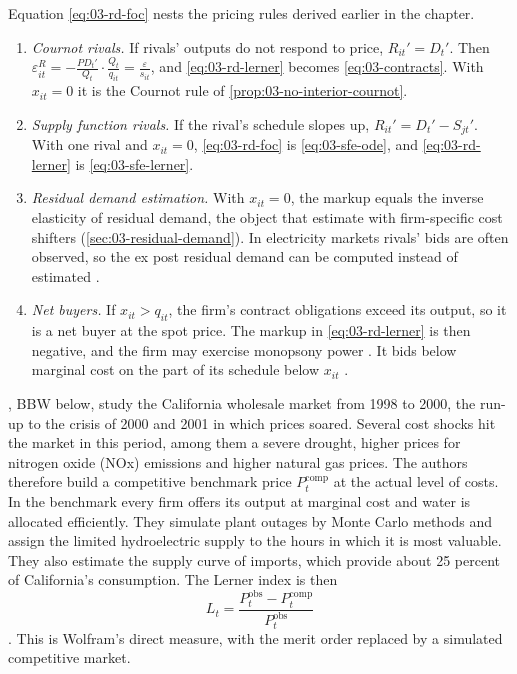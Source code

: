 \begin{remark}\label{rem:03-rd-nesting}
Equation \eqref{eq:03-rd-foc} nests the pricing rules derived earlier in the chapter.
\begin{enumerate}[label=(\roman*)]
\item \emph{Cournot rivals.} If rivals' outputs do not respond to price, $R_{it}' = D_t'$. Then
  $\varepsilon^R_{it} = -\frac{P D_t'}{Q_t}\cdot\frac{Q_t}{q_{it}} = \frac{\varepsilon}{s_{it}}$, and
  \eqref{eq:03-rd-lerner} becomes \eqref{eq:03-contracts}. With $x_{it} = 0$ it is the Cournot rule of
  \cref{prop:03-no-interior-cournot}.
\item \emph{Supply function rivals.} If the rival's schedule slopes up, $R_{it}' = D_t' - S_{jt}'$. With one rival
  and $x_{it} = 0$, \eqref{eq:03-rd-foc} is \eqref{eq:03-sfe-ode}, and \eqref{eq:03-rd-lerner} is
  \eqref{eq:03-sfe-lerner}.
\item \emph{Residual demand estimation.} With $x_{it} = 0$, the markup equals the inverse elasticity of residual
  demand, the object
  that \citet{BakerBresnahan1988} estimate with firm-specific cost shifters (\cref{sec:03-residual-demand}). In
  electricity markets rivals' bids are often observed, so the ex post residual demand can be computed instead of
  estimated \citep[p.~695]{KelloggReguant2021}.
\item \emph{Net buyers.} If $x_{it} > q_{it}$, the firm's contract obligations exceed its output, so it is a net
  buyer at the spot price. The markup in \eqref{eq:03-rd-lerner} is then negative, and the firm may exercise
  monopsony power \citep[p.~694]{KelloggReguant2021}. It bids below marginal cost on the part of its schedule below
  $x_{it}$ \citep[p.~145]{HortacsuPerrigne2021}.
\end{enumerate}
\end{remark}

\citet{BorensteinBushnellWolak2002}, BBW below, study the California wholesale market from 1998 to 2000, the run-up to the
crisis of 2000 and 2001 in which prices soared. Several cost shocks hit the market in this period, among them a severe
drought, higher prices for nitrogen oxide (NOx) emissions and higher natural gas prices. The authors therefore build a
competitive benchmark price $P^{\mathrm{comp}}_t$ at the actual level of costs. In the benchmark every firm offers its
output at marginal cost and water is allocated efficiently. They simulate plant outages by Monte Carlo methods and
assign the limited hydroelectric supply to the hours in which it is most valuable. They also estimate the supply curve
of imports, which provide about 25 percent of California's consumption. The Lerner index is then
\begin{equation*}
L_t = \frac{P^{\mathrm{obs}}_t - P^{\mathrm{comp}}_t}{P^{\mathrm{obs}}_t}
\end{equation*}
\citep[p.~693]{KelloggReguant2021}. This is Wolfram's direct measure, with the merit order replaced by a simulated
competitive market.

